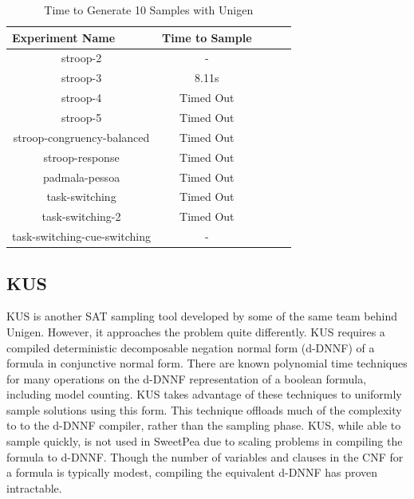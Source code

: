 \begin{table}
  \centering
  \caption{Time to Generate 10 Samples with Unigen}
\begin{tabular}{|c|c|c|c|c|}
\hline
\multicolumn{1}{|l|}{Experiment Name} & Time to Sample  \\ \hline
stroop-2                              & -               \\ \hline
stroop-3                              & 8.11s           \\ \hline
stroop-4                              & Timed Out       \\ \hline
stroop-5                              & Timed Out       \\ \hline
stroop-congruency-balanced            & Timed Out       \\ \hline
stroop-response                       & Timed Out       \\ \hline
padmala-pessoa                        & Timed Out       \\ \hline
task-switching                        & Timed Out       \\ \hline
task-switching-2                      & Timed Out       \\ \hline
task-switching-cue-switching          & -               \\ \hline
\end{tabular}
\label{tab:benchmark_experiments_unigen}%
\end{table}


\subsection{KUS}

KUS \cite{SGRM18} is another SAT sampling tool developed by some of the same team behind Unigen. However, it approaches the problem quite differently. KUS requires a compiled deterministic decomposable negation normal form (d-DNNF) of a formula in conjunctive normal form. There are known polynomial time techniques for many operations on the d-DNNF representation of a boolean formula, including model counting. KUS takes advantage of these techniques to uniformly sample solutions using this form. This technique offloads much of the complexity to to the d-DNNF compiler, rather than the sampling phase. KUS, while able to sample quickly, is not used in SweetPea due to scaling problems in compiling the formula to d-DNNF. Though the number of variables and clauses in the CNF for a formula is typically modest, compiling the equivalent d-DNNF has proven intractable.

